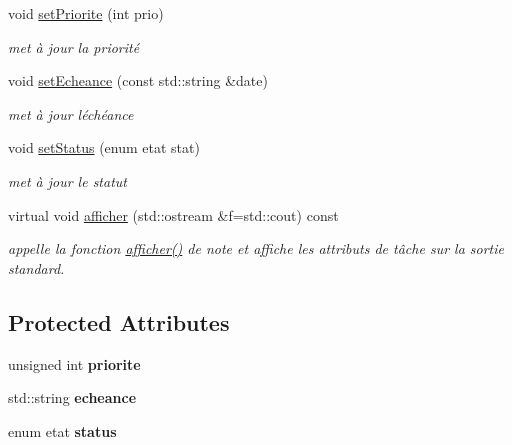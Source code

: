 \begin{DoxyCompactItemize}
void \hyperlink{classtache_a35292bd0bec7a172bf3c70ca3a441153}{set\+Priorite} (int prio)
\begin{DoxyCompactList}\small\item\em met à jour la priorité \end{DoxyCompactList}\item 
void \hyperlink{classtache_adaea7e42b4e6fc8f8903152300968e26}{set\+Echeance} (const std\+::string \&date)
\begin{DoxyCompactList}\small\item\em met à jour l\textquotesingle{}échéance \end{DoxyCompactList}\item 
void \hyperlink{classtache_afd4cda07440e36dc0f47079b110d022e}{set\+Status} (enum etat stat)
\begin{DoxyCompactList}\small\item\em met à jour le statut \end{DoxyCompactList}\item 
\mbox{\label{classtache_af319d97c3f228649dce7c24da39307aa}} 
virtual void \hyperlink{classtache_af319d97c3f228649dce7c24da39307aa}{afficher} (std\+::ostream \&f=std\+::cout) const
\begin{DoxyCompactList}\small\item\em appelle la fonction \hyperlink{classtache_af319d97c3f228649dce7c24da39307aa}{afficher()} de note et affiche les attributs de tâche sur la sortie standard. \end{DoxyCompactList}\end{DoxyCompactItemize}
\subsection*{Protected Attributes}
\begin{DoxyCompactItemize}
\item 
\mbox{\label{classtache_a50a5f64a76ff14f1467e2b0080618ab9}} 
unsigned int {\bfseries priorite}
\item 
\mbox{\label{classtache_ac49ccbd0d4cd98706d0f45feb4ebe60f}} 
std\+::string {\bfseries echeance}
\item 
\mbox{\label{classtache_acb16537d9ba98cde8d2abc3ac03acf77}} 
enum etat {\bfseries status}
\end{DoxyCompactItemize}



